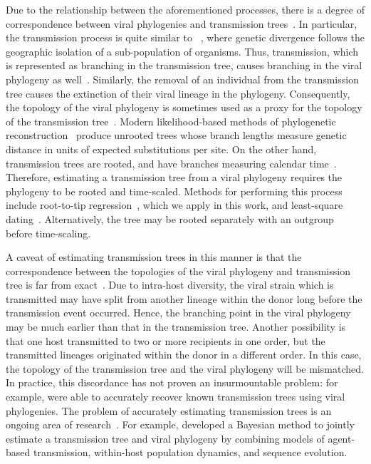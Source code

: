 Due to the relationship between the aforementioned processes, there is a degree
of correspondence between viral phylogenies and transmission
trees~\autocite{leitner2002molecular, ypma2013relating, kenah2015algorithms,
kenah2016molecular}. In particular, the transmission process is quite similar
to ~\autocite{coyne2004speciation}, where genetic
divergence follows the geographic isolation of a sub-population of organisms.
Thus, transmission, which is represented as branching in the transmission tree,
causes branching in the viral phylogeny as
well~\autocite{volz2009phylodynamics}. Similarly, the removal of an individual
from the transmission tree causes the extinction of their viral lineage in the
phylogeny. Consequently, the topology of the viral phylogeny is sometimes used
as a proxy for the topology of the transmission
tree~\autocite{hall2015epidemic}. Modern likelihood-based methods of
phylogenetic reconstruction~\autocite[\eg][]{price2010fasttree,
stamatakis2014raxml} produce unrooted trees whose branch lengths measure
genetic distance in units of expected substitutions per site. On the other
hand, transmission trees are rooted, and have branches measuring calendar
time~\autocite{pybus2009evolutionary}. Therefore, estimating a transmission
tree from a viral phylogeny requires the phylogeny to be rooted and
time-scaled. Methods for performing this process include root-to-tip
regression~\autocite{shankarappa1999consistent, korber2000timing,
drummond2003inference}, which we apply in this work, and least-square
dating~\autocite{to2016fast}. Alternatively, the tree may be rooted separately
with an outgroup~\autocite{li1988rates} before time-scaling.

A caveat of estimating transmission trees in this manner is that the
correspondence between the topologies of the viral phylogeny and transmission
tree is far from exact~\autocite{ypma2013relating, romero2014timing}.  Due to
intra-host diversity, the viral strain which is transmitted may have split from
another lineage within the donor long before the transmission event occurred.
Hence, the branching point in the viral phylogeny may be much earlier than that
in the transmission tree. Another possibility is that one host transmitted to
two or more recipients in one order, but the transmitted lineages originated
within the donor in a different order. In this case, the topology of the
transmission tree and the viral phylogeny will be mismatched. In practice, this
discordance has not proven an insurmountable problem: for example,
\textcite{leitner1996accurate, paraskevis2004phylogenetic} were able to
accurately recover known transmission trees using viral phylogenies. The
problem of accurately estimating transmission trees is an ongoing area of
research~\autocite{cottam2008integrating, jombart2011reconstructing,
ypma2012unravelling, morelli2012bayesian, didelot2014bayesian,
hall2015epidemic}. For example, \textcite{hall2015epidemic} developed a
Bayesian method to jointly estimate a transmission tree and viral phylogeny by
combining models of agent-based transmission, within-host population dynamics,
and sequence evolution.

